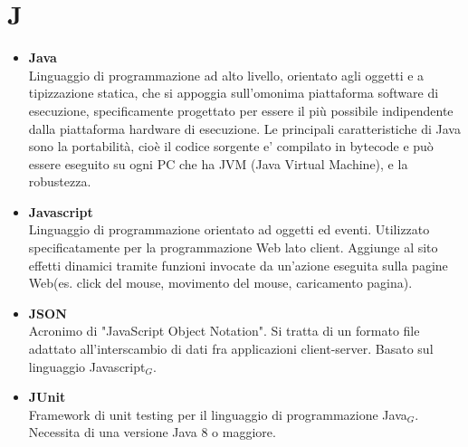 \chapter{J} \label{J}
\begin{itemize}
	\item \textbf{Java} \\
	 Linguaggio di programmazione ad alto livello, orientato agli oggetti e a tipizzazione statica, che si appoggia sull'omonima piattaforma software di esecuzione, specificamente progettato per essere il più possibile indipendente dalla piattaforma hardware di esecuzione. Le principali caratteristiche di Java sono la portabilità, cioè il codice sorgente e' compilato in bytecode e può essere eseguito su ogni PC che ha JVM (Java Virtual Machine), e la robustezza.

	 \item \textbf{Javascript} \\
	 Linguaggio di programmazione orientato ad oggetti ed eventi.
	 Utilizzato specificatamente per la programmazione Web lato client.
	 Aggiunge al sito effetti dinamici tramite funzioni invocate da un'azione eseguita sulla pagine Web(es. click del mouse, movimento del mouse, caricamento pagina).

	 \item \textbf{JSON} \\
	 Acronimo di "JavaScript Object Notation".
	 Si tratta di un formato file adattato all'interscambio di dati fra applicazioni client-server.
	 Basato sul linguaggio Javascript$_G$.

	 \item \textbf{JUnit} \\
	 Framework di unit testing per il linguaggio di programmazione Java$_G$.
	 Necessita di una versione Java 8 o maggiore.
\end{itemize}
